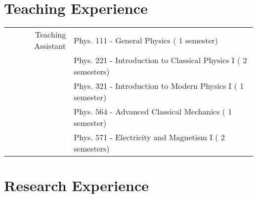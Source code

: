 \documentclass[a4paper,10pt]{article}
\begin{document}
\vspace{3mm}
\section{Teaching Experience}

\begin{tabular}{r | p{14.05cm}}
\multicolumn{1}{r|}{Teaching Assistant}		& Phys. 111 - General Physics \hfill ( 1 semester\phantom{s})				\\
\multicolumn{1}{r|}{}						& Phys. 221 - Introduction to Classical Physics I  \hfill ( 2 semesters) 		\\
\multicolumn{1}{r|}{}						& Phys. 321 - Introduction to Modern Physics I \hfill ( 1 semester\phantom{s}) 	\\
\multicolumn{1}{r|}{}						& Phys. 564 - Advanced Classical Mechanics \hfill ( 1 semester\phantom{s})	\\
\multicolumn{1}{r|}{}						& Phys. 571 - Electricity and Magnetism I \hfill ( 2 semesters) 				\\
\end{tabular}

\vspace{3mm}
\section{Research Experience}
\end{document}
